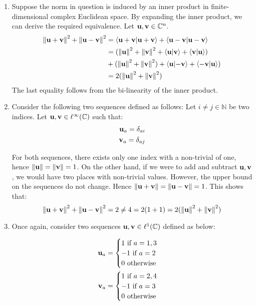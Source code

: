 \documentclass[12pt]{article}%
\begin{document}
\begin{enumerate}
  \item Suppose the norm in question is induced by an inner product in finite-dimensional complex Euclidean space. By expanding the inner product, we can derive the required equivalence. Let $\textbf{u},\textbf{v} \in {\mathbb{C}}^n$.
\begin{align*}
      \norm{\boldu + \boldv}^2 + \norm{\boldu - \boldv}^2 & = \ip{\boldu + \boldv} + \ip{\boldu - \boldv}{\boldu - \boldv} \\
      & = (\norm{\boldu}^2 + \norm{\boldv}^2 + \ip{\boldu}{\boldv} + \ip{\boldv}{\boldu}) \\
      & + (\norm{\boldu}^2 + \norm{\boldv}^2) + \ip{\boldu}{-\boldv} + \ip{-\boldv}{\boldu})\\
      & = 2(\norm{\boldu}^2 + \norm{\boldv}^2)
\end{align*}
The last equality follows from the bi-linearity of the inner product.

\item
Consider the following two sequences defined as follows: Let $i \neq j \in \mathbb{N}$ be two indices. Let $\textbf{u}, \textbf{v} \in \ell^{\infty}({\mathbb{C}})$ such that:
\begin{align*}
  \textbf{u}_a = \delta_{a i} \\
  \textbf{v}_a = \delta_{a j}
\end{align*}

For both sequences, there exists only one index with a non-trivial of one, hence $\norm{\textbf{u}} = \norm{\textbf{v}} = 1$. On the other hand, if we were to add and subtract $\textbf{u}, \textbf{v}$, we would have two places with non-trivial values. However, the upper bound on the sequences do not change. Hence $\norm{\textbf{u} + \textbf{v}} = \norm{\textbf{u} - \textbf{v}} = 1$. This shows that:
%
\begin{equation*}
  \norm{\textbf{u} + \textbf{v}}^2 + \norm{\textbf{u} - \textbf{v}}^2 = 2 \neq 4 = 2(1 + 1) = 2(\norm{\textbf{u}}^2 + \norm{\textbf{v}}^2)
\end{equation*}

\item Once again, consider two sequences $\textbf{u}, \textbf{v} \in \ell^{1}({\mathbb{C}})$ defined as below:

\begin{align*}
  \textbf{u}_a = \begin{cases}
      1 \text{ if } a = 1,3 \\
      -1 \text{ if } a = 2 \\
      0 \text{ otherwise }
\end{cases} \\
\textbf{v}_ a = \begin{cases}
    1 \text{ if } a = 2,4 \\
    -1 \text{ if } a = 3 \\
    0 \text{ otherwise }
\end{cases}
\end{align*}


\end{enumerate}
\end{document}
